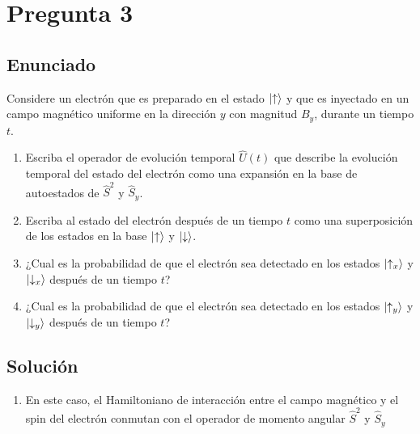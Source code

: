 \documentclass[12pt]{exam}
\begin{document}
\section{Pregunta 3}

\subsection{Enunciado}
Considere un electrón que es preparado en el estado $\left|\uparrow\right>$ y que es inyectado en un campo magnético uniforme en la dirección $y$ con magnitud $B_y$, durante un tiempo $t$.
\begin{enumerate}
	\item Escriba el operador de evolución temporal $\hat{U}(t)$ que describe la evolución temporal del estado del electrón como una expansión en la base de autoestados de $\hat{S}^2$ y $\hat{S}_y$.
	\item Escriba al estado del electrón después de un tiempo $t$ como una superposición de los estados en la base $\left|\uparrow\right>$ y $\left|\downarrow\right>$.
	\item ¿Cual es la probabilidad de que el electrón sea detectado en los estados $\left|\uparrow_x\right>$ y $\left|\downarrow_x\right>$ después de un tiempo $t$?
	\item ¿Cual es la probabilidad de que el electrón sea detectado en los estados $\left|\uparrow_y\right>$ y $\left|\downarrow_y\right>$ después de un tiempo $t$?
\end{enumerate}

\subsection{Solución}

\begin{enumerate}
  \item 
    En este caso, el Hamiltoniano de interacción entre el campo magnético y el spin del electrón conmutan con el operador de momento angular $\hat{S}^2$ y $\hat{S}_y$
\end{enumerate}
\end{document}
